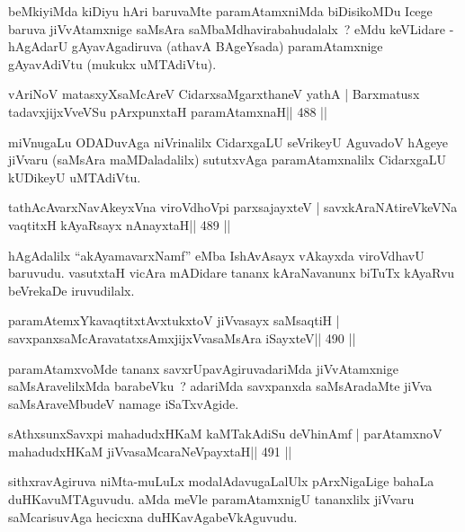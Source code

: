 \begin{artha}
beMkiyiMda kiDiyu hAri baruvaMte paramAtamxniMda biDisikoMDu Icege baruva jiVvAtamxnige saMsAra saMbaMdhavirabahudalalx~? eMdu keVLidare - hAgAdarU gAyavAgadiruva (athavA BAgeYsada) paramAtamxnige gAyavAdiVtu (mukukx uMTAdiVtu).
\end{artha}

\begin{shl}
vAriNoV matasxyXsaMcAreV CidarxsaMgarxthaneV yathA |
Barxmatusx tadavxjijxVveVSu pArxpunxtaH paramAtamxnaH\hfill || 488 ||
\end{shl}

\begin{artha}
miVnugaLu ODADuvAga niVrinalilx CidarxgaLU seVrikeyU AguvadoV hAgeye jiVvaru (saMsAra maMDaladalilx) sututxvAga paramAtamxnalilx CidarxgaLU kUDikeyU uMTAdiVtu.
\end{artha}

\begin{shl}
tathAcAvarxNavAkeyxVna viroVdhoV\s pi parxsajayxteV |
savxkAraNAtireVkeVNa vaqtitxH kAyaRsayx nAnayxtaH\hfill || 489 ||
\end{shl}

\begin{artha}
hAgAdalilx ``akAyamavarxNamf'' eMba IshAvAsayx vAkayxda viroVdhavU baruvudu. vasutxtaH vicAra mADidare tananx kAraNavanunx biTuTx kAyaRvu beVrekaDe iruvudilalx.
\end{artha}

\begin{shl}
paramAtemxYkavaqtitxtAvxtukxtoV jiVvasayx saMsaqtiH |
savxpanxsaMcAravatatxsAmxjijxVvasaMsAra iSayxteV\hfill || 490 ||
\end{shl}

\begin{artha}
paramAtamxvoMde tananx savxrUpavAgiruvadariMda jiVvAtamxnige saMsAravelilxMda barabeVku~? adariMda savxpanxda saMsAradaMte jiVva saMsAraveMbudeV namage iSaTxvAgide.
\end{artha}

\begin{shl}
sAthxsunxSavxpi mahadudxHKaM kaMTakAdiSu deVhinAmf |
parAtamxnoV mahadudxHKaM jiVvasaMcaraNeV\s payxtaH\hfill || 491 ||
\end{shl}

\begin{artha}
sithxravAgiruva niMta-muLuLx modalAdavugaLalUlx pArxNigaLige bahaLa duHKavuMTAguvudu. aMda meVle paramAtamxnigU tananxlilx jiVvaru saMcarisuvAga hecicxna duHKavAgabeVkAguvudu.
\end{artha}

